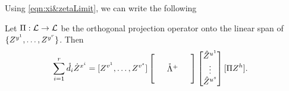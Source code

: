 \documentclass[main.tex]{subfiles}
\begin{document}
  

Using \cref{eqn:xi&zetaLimit}, we can write the following
\begin{lemma}\label{lemma:DtrxhHatGReExpression}
  Let $\Pi: \mathcal{L} \to \mathcal{L}$ be the orthogonal projection operator onto the linear span of $\{ Z^{y^1}, \ldots,  Z^{y^r}\}$.
  Then
  \begin{align}
  \sum_{i=1}^r \mathring{\dme}_i \Zdot^{\xme^i}
    &=
      [
        Z^{\vme^1},
        \ldots,
        Z^{\vme^s}
      ]
      \begin{bmatrix}
      \phz
        &\phz
          &\phz\\
      \phz
        &\mathring{\Lambdame }^+
          &\phz\\
      \phz
        &\phz
          &\phz
      \end{bmatrix}
      \begin{bmatrix}
      \Zhat^{\ume^1}\\
      \vdots\\
      \Zhat^{\ume^s}
      \end{bmatrix}
      [\Pi  Z^{h}]    
      .
      \label{eqn:zetaZdot}
  \end{align}
\end{lemma}
\end{document}
